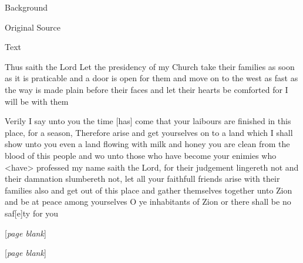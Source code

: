 				\begin{description}
					\item[Background]
				\end{description}
				
				
				\begin{description}
					\item[Original Source]
				\end{description}
				
				
				\begin{description}
					\item[Text]
				\end{description}
				
					Thus saith the Lord Let the presidency of my Church take their families as soon as it is praticable and a door is open for them and move on to the west as fast as the way is made plain before their faces and let their hearts be comforted for I will be with them
					
					Verily I say unto you the time [has] come that your laibours are finished in this place, for a season, Therefore arise and get yourselves on to a land which I shall show unto you even a land flowing with milk and honey you are clean from the blood of this people and wo unto those who have become your enimies who <have> professed my name saith the Lord, for their judgement lingereth not and their damnation slumbereth not, let all your faithfull friends arise with their families also and get out of this place and gather themselves together unto Zion and be at peace among yourselves O ye inhabitants of Zion or there shall be no saf[e]ty for you
					
					[\textit{page blank}]
					
					[\textit{page blank}]
					
